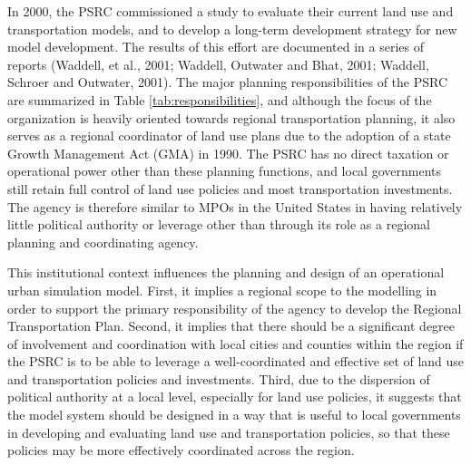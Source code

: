 In 2000, the PSRC commissioned a study to evaluate their current land use and transportation models, and to develop a long-term development strategy for new model development.  The results of this effort are documented in a series of reports (Waddell, et al., 2001; Waddell, Outwater and Bhat, 2001; Waddell, Schroer and Outwater, 2001).  The major planning responsibilities of the PSRC are summarized in Table \ref{tab:responsibilities}, and although the focus of the organization is heavily oriented towards regional transportation planning, it also serves as a regional coordinator of land use plans due to the adoption of a state Growth Management Act (GMA) in 1990.  The PSRC has no direct taxation or operational power other than these planning functions, and local governments still retain full control of land use policies and most transportation investments.  The agency is therefore similar to MPOs in the United States in having relatively little political authority or leverage other than through its role as a regional planning and coordinating agency.

This institutional context influences the planning and design of an operational urban simulation model.  First, it implies a regional scope to the modelling in order to support the primary responsibility of the agency to develop the Regional Transportation Plan.  Second, it implies that there should be a significant degree of involvement and coordination with local cities and counties within the region if the PSRC is to be able to leverage a well-coordinated and effective set of land use and transportation policies and investments.  Third, due to the dispersion of political authority at a local level, especially for land use policies, it suggests that the model system should be designed in a way that is useful to local governments in developing and evaluating land use and transportation policies, so that these policies may be more effectively coordinated across the region.


